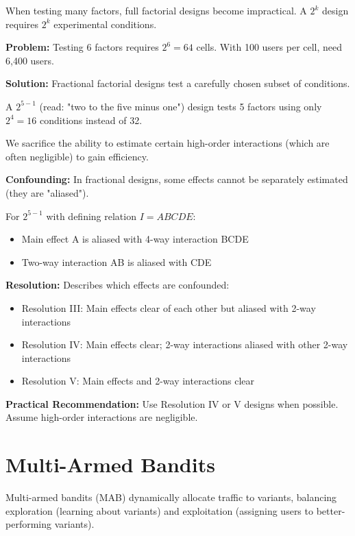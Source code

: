When testing many factors, full factorial designs become impractical. A $2^k$ design requires $2^k$ experimental conditions.

\textbf{Problem:} Testing 6 factors requires $2^6 = 64$ cells. With 100 users per cell, need 6,400 users.

\textbf{Solution:} Fractional factorial designs test a carefully chosen subset of conditions.

\begin{example}
A $2^{5-1}$ (read: "two to the five minus one") design tests 5 factors using only $2^4 = 16$ conditions instead of 32.

We sacrifice the ability to estimate certain high-order interactions (which are often negligible) to gain efficiency.
\end{example}

\textbf{Confounding:} In fractional designs, some effects cannot be separately estimated (they are "aliased").

For $2^{5-1}$ with defining relation $I = ABCDE$:
\begin{itemize}
    \item Main effect A is aliased with 4-way interaction BCDE
    \item Two-way interaction AB is aliased with CDE
\end{itemize}

\textbf{Resolution:} Describes which effects are confounded:
\begin{itemize}
    \item Resolution III: Main effects clear of each other but aliased with 2-way interactions
    \item Resolution IV: Main effects clear; 2-way interactions aliased with other 2-way interactions
    \item Resolution V: Main effects and 2-way interactions clear
\end{itemize}

\textbf{Practical Recommendation:} Use Resolution IV or V designs when possible. Assume high-order interactions are negligible.

\section{Multi-Armed Bandits}

Multi-armed bandits (MAB) dynamically allocate traffic to variants, balancing exploration (learning about variants) and exploitation (assigning users to better-performing variants).

